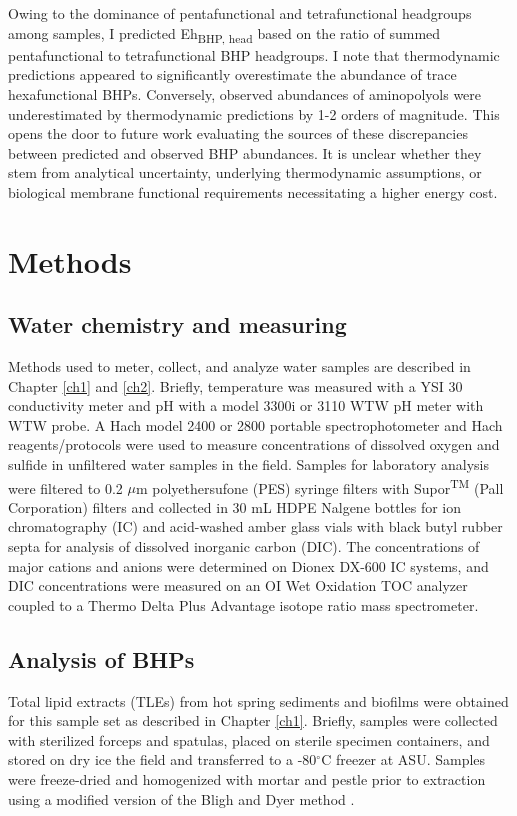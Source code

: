 Owing to the dominance of pentafunctional and tetrafunctional headgroups among samples, I predicted Eh\textsubscript{BHP, head} based on the ratio of summed pentafunctional to tetrafunctional BHP headgroups. I note that thermodynamic predictions appeared to significantly overestimate the abundance of trace hexafunctional BHPs. Conversely, observed abundances of aminopolyols were underestimated by thermodynamic predictions by 1-2 orders of magnitude. This opens the door to future work evaluating the sources of these discrepancies between predicted and observed BHP abundances. It is unclear whether they stem from analytical uncertainty, underlying thermodynamic assumptions, or biological membrane functional requirements necessitating a higher energy cost.




\section{Methods}

\subsection{Water chemistry and measuring}
Methods used to meter, collect, and analyze water samples are described in Chapter \ref{ch1} and \ref{ch2}. Briefly, temperature was measured with a YSI 30 conductivity meter and pH with a model 3300i or 3110 WTW pH meter with WTW probe. A Hach model 2400 or 2800 portable spectrophotometer and Hach reagents/protocols were used to measure concentrations of dissolved oxygen and sulfide in unfiltered water samples in the field. Samples for laboratory analysis were filtered to 0.2 $\mu$m polyethersufone (PES) syringe filters with Supor\textsuperscript{TM} (Pall Corporation) filters and collected in 30 mL HDPE Nalgene bottles for ion chromatography (IC) and acid-washed amber glass vials with black butyl rubber septa for analysis of dissolved inorganic carbon (DIC). The concentrations of major cations and anions were determined on Dionex DX-600 IC systems, and DIC concentrations were measured on an OI Wet Oxidation TOC analyzer coupled to a Thermo Delta Plus Advantage isotope ratio mass spectrometer.

\subsection{Analysis of BHPs} Total lipid extracts (TLEs) from hot spring sediments and biofilms were obtained for this sample set as described in Chapter \ref{ch1}. Briefly, samples were collected with sterilized forceps and spatulas, placed on sterile specimen containers, and stored on dry ice the field and transferred to a -80$^{\circ}$C freezer at ASU. Samples were freeze-dried and homogenized with mortar and pestle prior to extraction using a modified version of the Bligh and Dyer method \citep{white1998signature}.

